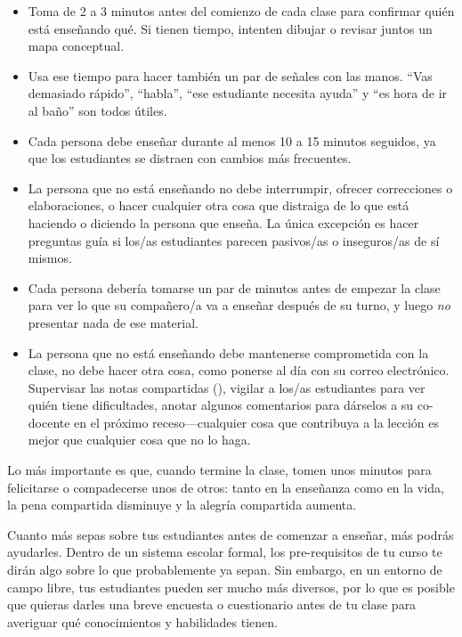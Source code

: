 \begin{itemize}

\item
  Toma de 2 a 3 minutos antes del comienzo de cada clase
  para confirmar quién está enseñando qué.
  Si tienen tiempo,
  intenten dibujar o revisar juntos un mapa conceptual.

\item
  Usa ese tiempo para hacer también un par de señales con las manos.
  ``Vas demasiado rápido'',
  ``habla'',
  ``ese estudiante necesita ayuda''
  y ``es hora de ir al baño'' son todos útiles.

\item
  Cada persona debe enseñar durante al menos 10 a 15 minutos seguidos,
  ya que los estudiantes se distraen con cambios más frecuentes.

\item
  La persona que no está enseñando no debe interrumpir,
  ofrecer correcciones o elaboraciones,
  o hacer cualquier otra cosa que distraiga de lo que está haciendo o diciendo la persona que enseña.
  La única excepción es hacer preguntas guía
  si los/as estudiantes parecen pasivos/as o inseguros/as de sí mismos.
 
\item
  Cada persona debería tomarse un par de minutos antes de empezar la clase
  para ver lo que su compañero/a va a enseñar después de su turno,
  y luego \emph{no} presentar nada de ese material.

\item
  La persona que no está enseñando debe mantenerse comprometida con la clase,
  no debe hacer otra cosa, como ponerse al día con su correo electrónico.
  Supervisar las notas compartidas (),
  vigilar a los/as estudiantes para ver quién tiene dificultades,
  anotar algunos comentarios para dárselos a su co-docente en el próximo receso---cualquier
  cosa que contribuya a la lección es mejor que cualquier cosa que no lo haga.
 
\end{itemize}

Lo más importante es que,
cuando termine la clase, tomen unos minutos para felicitarse o compadecerse unos de otros:
tanto en la enseñanza como en la vida,
la pena compartida disminuye y la alegría compartida aumenta.


Cuanto más sepas sobre tus estudiantes antes de comenzar a enseñar,
más podrás ayudarles.
Dentro de un sistema escolar formal,
los pre-requisitos de tu curso te dirán algo sobre
lo que probablemente ya sepan.
Sin embargo,
en un entorno de campo libre,
tus estudiantes pueden ser mucho más diversos,
por lo que es posible que quieras darles una breve encuesta o cuestionario antes de tu clase
para averiguar qué conocimientos y habilidades tienen.

